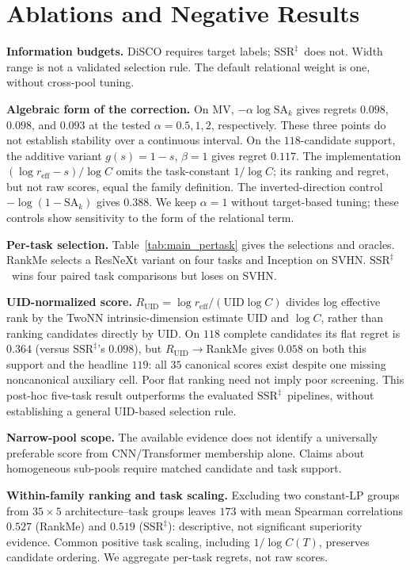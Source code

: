 \documentclass{article}
\newcommand{\reff}{\ensuremath{r_{\mathrm{eff}}}\xspace}
\newcommand{\SAk}{\ensuremath{\mathrm{SA}_k}\xspace}
\newcommand{\UID}{\ensuremath{\mathrm{UID}}\xspace}
\newcommand{\SSRdag}{\ensuremath{\mathrm{SSR}^{\ddagger}}\xspace}
\begin{document}
\section{Ablations and Negative Results}
\label{app:ablations}

\textbf{Information budgets.} DiSCO requires target labels; \SSRdag\ does not. Width range is not a validated selection rule. The default relational weight is one, without cross-pool tuning.

\textbf{Algebraic form of the correction.} On MV, $-\alpha\log\SAk$ gives regrets $0.098$, $0.098$, and $0.093$ at the tested $\alpha=0.5,1,2$, respectively. These three points do not establish stability over a continuous interval. On the $118$-candidate support, the additive variant $g(s)=1-s$, $\beta=1$ gives regret $0.117$. The implementation $(\log\reff-s)/\log C$ omits the task-constant $1/\log C$; its ranking and regret, but not raw scores, equal the family definition. The inverted-direction control $-\log(1-\SAk)$ gives $0.388$. We keep $\alpha=1$ without target-based tuning; these controls show sensitivity to the form of the relational term.

\textbf{Per-task selection.} Table~\ref{tab:main_pertask} gives the selections and oracles. RankMe selects a ResNeXt variant on four tasks and Inception on SVHN. \SSRdag\ wins four paired task comparisons but loses on SVHN.



\textbf{UID-normalized score.} $R_{\mathrm{UID}}=\log\reff/(\UID\log C)$ divides log effective rank by the TwoNN intrinsic-dimension estimate UID \citep{facco2017estimating} and $\log C$, rather than ranking candidates directly by UID. On $118$ complete candidates its flat regret is $0.364$ (versus \SSRdag's $0.098$), but $R_{\mathrm{UID}}\to$RankMe gives $0.058$ on both this support and the headline $119$: all $35$ canonical scores exist despite one missing noncanonical auxiliary cell. Poor flat ranking need not imply poor screening. This post-hoc five-task result outperforms the evaluated \SSRdag\ pipelines, without establishing a general UID-based selection rule.

\textbf{Narrow-pool scope.} The available evidence does not identify a universally preferable score from CNN/Transformer membership alone. Claims about homogeneous sub-pools require matched candidate and task support.

\textbf{Within-family ranking and task scaling.} Excluding two constant-LP groups from $35\times5$ architecture--task groups leaves $173$ with mean Spearman correlations $0.527$ (RankMe) and $0.519$ (\SSRdag): descriptive, not significant superiority evidence. Common positive task scaling, including $1/\log C(T)$, preserves candidate ordering. We aggregate per-task regrets, not raw scores.
\end{document}
